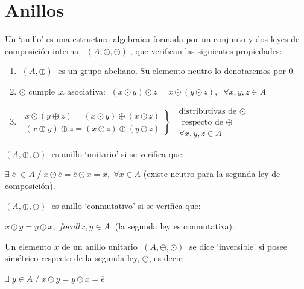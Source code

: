 \section{Anillos}
\begin{defi} Un `anillo' es una estructura algebraica formada por un conjunto y dos leyes de composición interna, $\; (A,\oplus, \odot)\; $, que verifican las siguientes propiedades:
\begin{enumerate}
	\item $\; (A,\oplus)\;$ es un grupo abeliano. Su elemento neutro lo denotaremos por $0$.
	\item $\odot$ cumple la asociativa: $\; (x\odot y)\odot z=x \odot(y \odot z), \; \; \forall x,y,z \in A$	
	\item $\; \left. \begin{matrix}
	x\odot (y \oplus z)=(x\odot y)\oplus(x \odot z)\\
	(x\oplus y)\oplus z= (x \odot z)\oplus (y \odot z)
\end{matrix} \right\} \; \; \begin{matrix}
\text{distributivas de } \odot \\ 
\text { respecto de } \oplus 	\\
\forall x,y,z \in A
 \end{matrix}$
\end{enumerate}
\end{defi}	
\begin{defi}
$(A,\oplus, \odot)\; $ es anillo `unitario' si se verifica que:

$\exists \; \overline{e} \; \in A \; / \; x\odot \overline{e} = \overline{e} \odot x = x, \; \forall x \in A$	(existe neutro para la segunda ley de composición).
\end{defi}
\begin{defi}
$(A,\oplus, \odot)\; $ es anillo `conmutativo' si se verifica que:

$x\odot y = y \odot x, \; forall x,y \in A\; $	(la segunda ley es conmutativa).
\end{defi}
\begin{defi}
Un elemento $x$ de un anillo unitario 	$\; (A,\oplus, \odot)\; $ se dice `inversible' si posee simétrico respecto de la segunda ley, $\odot$, es decir:

$ \exists \; y \in A\; / \; x\odot y=y\odot x = \overline{e}$
\end{defi}
